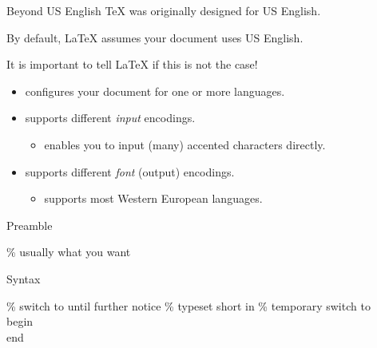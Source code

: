 \begin{frame}{Beyond US English}
  \TeX{} was originally designed for US English.

  By default, \LaTeX{} assumes your document uses US English.

  It is important to tell \LaTeX{} if this is not the case!

  \begin{itemize}
    \item {} configures your document for one or more languages.
    \item {} supports different \emph{input} encodings.
    \begin{itemize}
      \item {} enables you to input (many) accented characters directly.
    \end{itemize}
    \item {} supports different \emph{font} (output) encodings.
    \begin{itemize}
      \item {} supports most Western European languages.
    \end{itemize}
  \end{itemize}

\end{frame}
\begin{frame}[fragile]

  \begin{block}{Preamble}
    \begin{semiverbatim}
      \alert<1>{}
      \alert<1>{}
      \alert<2>{}
      \alert<3>{}\% usually what you want
    \end{semiverbatim}
  \end{block}

\end{frame}
\begin{frame}[fragile]

  \begin{block}{Syntax}
    \begin{semiverbatim}
      \% switch to  until further notice
      \alert<1>{}
      \% typeset short  in 
      \alert<2>{}
      \% temporary switch to 
      \alert<3>{\\begin{}
      \\end{}}
    \end{semiverbatim}
  \end{block}

\end{frame}

